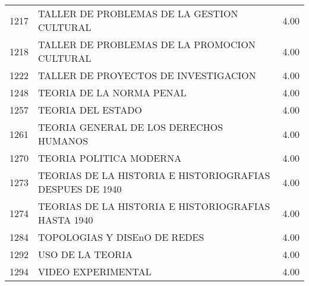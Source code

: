 \documentclass[12pt]{article}
\begin{document}
\begin{table}[ht]
{\begin{tabular}{rlr}
  1217 & TALLER DE PROBLEMAS DE LA GESTION CULTURAL & 4.00 \\ 
  1218 & TALLER DE PROBLEMAS DE LA PROMOCION CULTURAL & 4.00 \\ 
  1222 & TALLER DE PROYECTOS DE INVESTIGACION & 4.00 \\ 
  1248 & TEORIA DE LA NORMA PENAL & 4.00 \\ 
  1257 & TEORIA DEL ESTADO & 4.00 \\ 
  1261 & TEORIA GENERAL DE LOS DERECHOS HUMANOS & 4.00 \\ 
  1270 & TEORIA POLITICA MODERNA & 4.00 \\ 
  1273 & TEORIAS DE LA HISTORIA E HISTORIOGRAFIAS DESPUES DE 1940 & 4.00 \\ 
  1274 & TEORIAS DE LA HISTORIA E HISTORIOGRAFIAS HASTA 1940 & 4.00 \\ 
  1284 & TOPOLOGIAS Y DISEnO DE REDES & 4.00 \\ 
  1292 & USO DE LA TEORIA & 4.00 \\ 
  1294 & VIDEO EXPERIMENTAL & 4.00 \\ 
   \hline
\end{tabular}}
\end{table}
\end{document}
